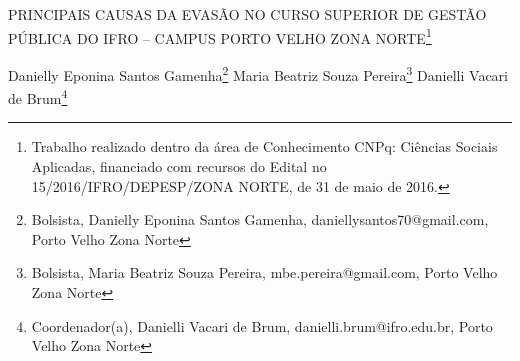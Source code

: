 \documentclass[article,12pt,onesidea,4paper,english,brazil]{abntex2}
\begin{document}
	
	
	\frenchspacing 
	
	\begin{center}
		\LARGE PRINCIPAIS CAUSAS DA EVASÃO NO CURSO SUPERIOR DE GESTÃO PÚBLICA
		DO IFRO – CAMPUS PORTO VELHO ZONA NORTE\footnote{Trabalho realizado dentro da área de Conhecimento CNPq: Ciências Sociais Aplicadas, financiado
			com recursos do Edital no 15/2016/IFRO/DEPESP/ZONA NORTE, de 31 de maio de 2016.}
		
		\normalsize
		Danielly Eponina Santos Gamenha\footnote{Bolsista, Danielly Eponina Santos Gamenha, daniellysantos70@gmail.com, Porto Velho Zona Norte} 
		Maria Beatriz Souza Pereira\footnote{Bolsista, Maria Beatriz Souza Pereira, mbe.pereira@gmail.com, Porto Velho Zona Norte} 
		Danielli Vacari de Brum\footnote{Coordenador(a), Danielli Vacari de Brum, danielli.brum@ifro.edu.br, Porto Velho Zona Norte} 
		 
	\end{center}
	
\end{document}
